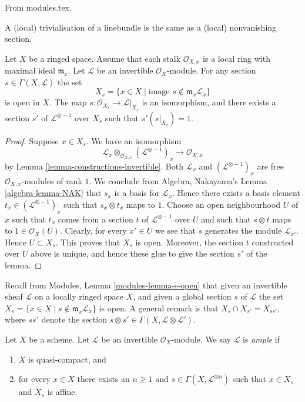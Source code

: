 \documentclass{book}
\begin{document}
\begin{lemma}
\label{lemma-s-open}
From modules.tex.
\begin{slogan}
A (local) trivialisation of a linebundle
is the same as a (local) nonvanishing
section.
\end{slogan}
Let $X$ be a ringed space. Assume that each
stalk $\mathcal{O}_{X, x}$
is a local ring with maximal ideal $\mathfrak
m_x$.
Let $\mathcal{L}$ be an invertible
$\mathcal{O}_X$-module.
For any section $s \in \Gamma(X,
\mathcal{L})$ the set
$$
X_s = \{x \in X \mid \text{image }s \not\in
\mathfrak m_x\mathcal{L}_x\}
$$
is open in $X$. The map $s :
\mathcal{O}_{X_s} \to \mathcal{L}|_{X_s}$
is an isomorphism, and there exists a section
$s'$
of $\mathcal{L}^{\otimes -1}$ over $X_s$ such
that $s' (s|_{X_s}) = 1$.
\end{lemma}

\begin{proof}
Suppose $x \in X_s$.
We have an isomorphism
$$
\mathcal{L}_x \otimes_{\mathcal{O}_{X, x}}
(\mathcal{L}^{\otimes -1})_x
\longrightarrow
\mathcal{O}_{X, x}
$$
by Lemma
\ref{lemma-constructions-invertible}.
Both $\mathcal{L}_x$ and
$(\mathcal{L}^{\otimes -1})_x$
are free $\mathcal{O}_{X, x}$-modules of rank
$1$. We conclude
from Algebra, Nakayama's Lemma
\ref{algebra-lemma-NAK} that
$s_x$ is a basis for $\mathcal{L}_x$. Hence
there exists
a basis element $t_x \in
(\mathcal{L}^{\otimes -1})_x$
such that $s_x \otimes t_x$ maps to $1$.
Choose an open neighbourhood $U$ of
$x$ such that $t_x$ comes from a section $t$
of $\mathcal{L}^{\otimes -1}$ over $U$ and
such that
$s \otimes t$ maps to $1 \in
\mathcal{O}_X(U)$.
Clearly, for every $x' \in U$ we see that $s$
generates
the module $\mathcal{L}_{x'}$. Hence $U
\subset X_s$.
This proves that $X_s$ is open. Moreover, the
section
$t$ constructed over $U$ above is unique, and
hence
these glue to give the section $s'$ of the
lemma.
\end{proof}

Recall from Modules, Lemma
\ref{modules-lemma-s-open}
that given an invertible sheaf $\mathcal{L}$
on a locally ringed
space $X$, and given a global section $s$ of
$\mathcal{L}$
the set $X_s = \{x \in X \mid s \not \in
\mathfrak m_x\mathcal{L}_x\}$
is open. A general remark is that
$X_s \cap X_{s'} = X_{ss'}$, where $ss'$
denote
the section $s \otimes s' \in \Gamma(X,
\mathcal{L} \otimes \mathcal{L}')$.

\begin{definition}
\label{definition-ample}
\begin{reference}
\cite[II Definition 4.5.3]{EGA}
\end{reference}
Let $X$ be a scheme.
Let $\mathcal{L}$ be an invertible
$\mathcal{O}_X$-module.
We say $\mathcal{L}$ is {\it ample} if
\begin{enumerate}
\item $X$ is quasi-compact, and
\item for every $x \in X$ there exists an $n
\geq 1$
and $s \in \Gamma(X, \mathcal{L}^{\otimes
n})$ such
that $x \in X_s$ and $X_s$ is affine.
\end{enumerate}
\end{definition}
\end{document}
